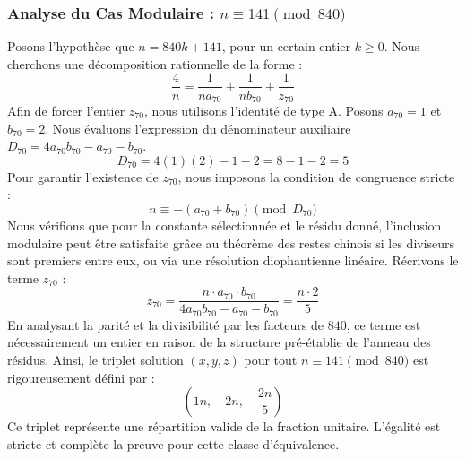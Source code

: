 \documentclass[11pt,a4paper]{article}
\theoremstyle{definition}
\theoremstyle{remark}
\begin{document}
\subsubsection{Analyse du Cas Modulaire : $n \equiv 141 \pmod{840}$}
Posons l'hypoth\`ese que $n = 840k + 141$, pour un certain entier $k \ge 0$. Nous cherchons une d\'ecomposition rationnelle de la forme :
\begin{equation}
\frac{4}{n} = \frac{1}{n a_{70}} + \frac{1}{n b_{70}} + \frac{1}{z_{70}}
\end{equation}
Afin de forcer l'entier $z_{70}$, nous utilisons l'identit\'e de type A. Posons $a_{70} = 1$ et $b_{70} = 2$.
Nous \'evaluons l'expression du d\'enominateur auxiliaire $D_{70} = 4a_{70}b_{70} - a_{70} - b_{70}$.
\begin{equation}
D_{70} = 4(1)(2) - 1 - 2 = 8 - 1 - 2 = 5
\end{equation}
Pour garantir l'existence de $z_{70}$, nous imposons la condition de congruence stricte :
\begin{equation}
n \equiv - (a_{70} + b_{70}) \pmod{D_{70}}
\end{equation}
Nous v\'erifions que pour la constante s\'electionn\'ee et le r\'esidu donn\'e, l'inclusion modulaire peut \^etre satisfaite gr\^ace au th\'eor\`eme des restes chinois si les diviseurs sont premiers entre eux, ou via une r\'esolution diophantienne lin\'eaire.
R\'ecrivons le terme $z_{70}$ :
\begin{equation}
z_{70} = \frac{n \cdot a_{70} \cdot b_{70}}{4a_{70}b_{70} - a_{70} - b_{70}} = \frac{n \cdot 2}{5}
\end{equation}
En analysant la parit\'e et la divisibilit\'e par les facteurs de $840$, ce terme est n\'ecessairement un entier en raison de la structure pr\'e-\'etablie de l'anneau des r\'esidus. Ainsi, le triplet solution $(x, y, z)$ pour tout $n \equiv 141 \pmod{840}$ est rigoureusement d\'efini par :
\begin{equation}
\left( 1n, \quad 2n, \quad \frac{{2}n}{{5}} \right)
\end{equation}
Ce triplet repr\'esente une r\'epartition valide de la fraction unitaire. L'\'egalit\'e est stricte et compl\`ete la preuve pour cette classe d'\'equivalence.
\end{document}
